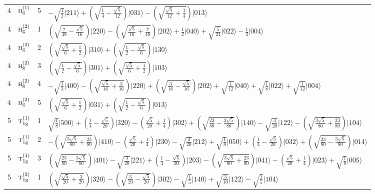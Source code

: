 \documentclass[11pt]{article}
\newcommand{\irr}[1]{\text{\normalfont\scshape #1}}
\newcommand{\ptag}[1]{\mathrm{#1}}
\newcommand{\occ}[1]{\lvert #1\rangle}
\begin{document}
\begin{longtable}{c l c p{}}
4 & $\irr{h}_{\ptag{g}}^{(1)}$ & 5 & $-\sqrt{\tfrac{1}{2}}\occ{211}+(\sqrt{\frac{1}{4} - \frac{\sqrt{5}}{12}})\occ{031}-(\sqrt{\frac{\sqrt{5}}{12} + \frac{1}{4}})\occ{013}$\\
4 & $\irr{h}_{\ptag{g}}^{(2)}$ & 1 & $(\sqrt{\frac{7}{48} - \frac{\sqrt{5}}{16}})\occ{220}-(\sqrt{\frac{\sqrt{5}}{16} + \frac{7}{48}})\occ{202}+\tfrac{1}{2}\occ{040}+\sqrt{\tfrac{5}{24}}\occ{022}-\tfrac{1}{2}\occ{004}$\\
4 & $\irr{h}_{\ptag{g}}^{(2)}$ & 2 & $(\sqrt{\frac{\sqrt{5}}{6} + \frac{1}{2}})\occ{310}+(\sqrt{\frac{1}{2} - \frac{\sqrt{5}}{6}})\occ{130}$\\
4 & $\irr{h}_{\ptag{g}}^{(2)}$ & 3 & $(\sqrt{\frac{1}{2} - \frac{\sqrt{5}}{6}})\occ{301}+(\sqrt{\frac{\sqrt{5}}{6} + \frac{1}{2}})\occ{103}$\\
4 & $\irr{h}_{\ptag{g}}^{(2)}$ & 4 & $-\sqrt{\tfrac{1}{3}}\occ{400}-(\sqrt{\frac{\sqrt{5}}{16} + \frac{3}{16}})\occ{220}+(\sqrt{\frac{3}{16} - \frac{\sqrt{5}}{16}})\occ{202}+\sqrt{\tfrac{1}{12}}\occ{040}+\sqrt{\tfrac{1}{8}}\occ{022}+\sqrt{\tfrac{1}{12}}\occ{004}$\\
4 & $\irr{h}_{\ptag{g}}^{(2)}$ & 5 & $(\sqrt{\frac{\sqrt{5}}{6} + \frac{1}{2}})\occ{031}+(\sqrt{\frac{1}{2} - \frac{\sqrt{5}}{6}})\occ{013}$\\
\hline
5 & $\irr{t}_{1\ptag{g}}^{(1)}$ & 1 & $\sqrt{\tfrac{1}{8}}\occ{500}+(\frac{1}{4} - \frac{\sqrt{5}}{20})\occ{320}-(\frac{\sqrt{5}}{20} + \frac{1}{4})\occ{302}+(\sqrt{\frac{23}{80} - \frac{3 \sqrt{5}}{80}})\occ{140}-\sqrt{\tfrac{3}{20}}\occ{122}-(\sqrt{\frac{3 \sqrt{5}}{80} + \frac{23}{80}})\occ{104}$\\
5 & $\irr{t}_{1\ptag{g}}^{(1)}$ & 2 & $-(\sqrt{\frac{3 \sqrt{5}}{80} + \frac{23}{80}})\occ{410}-(\frac{\sqrt{5}}{20} + \frac{1}{4})\occ{230}-\sqrt{\tfrac{3}{20}}\occ{212}+\sqrt{\tfrac{1}{8}}\occ{050}+(\frac{1}{4} - \frac{\sqrt{5}}{20})\occ{032}+(\sqrt{\frac{23}{80} - \frac{3 \sqrt{5}}{80}})\occ{014}$\\
5 & $\irr{t}_{1\ptag{g}}^{(1)}$ & 3 & $(\sqrt{\frac{23}{80} - \frac{3 \sqrt{5}}{80}})\occ{401}-\sqrt{\tfrac{3}{20}}\occ{221}+(\frac{1}{4} - \frac{\sqrt{5}}{20})\occ{203}-(\sqrt{\frac{3 \sqrt{5}}{80} + \frac{23}{80}})\occ{041}-(\frac{\sqrt{5}}{20} + \frac{1}{4})\occ{023}+\sqrt{\tfrac{1}{8}}\occ{005}$\\
5 & $\irr{t}_{1\ptag{g}}^{(2)}$ & 1 & $(\sqrt{\frac{\sqrt{5}}{20} + \frac{3}{20}})\occ{320}-(\sqrt{\frac{3}{20} - \frac{\sqrt{5}}{20}})\occ{302}-\sqrt{\tfrac{1}{5}}\occ{140}+\sqrt{\tfrac{3}{10}}\occ{122}-\sqrt{\tfrac{1}{5}}\occ{104}$\\

\end{longtable}
\end{document}
